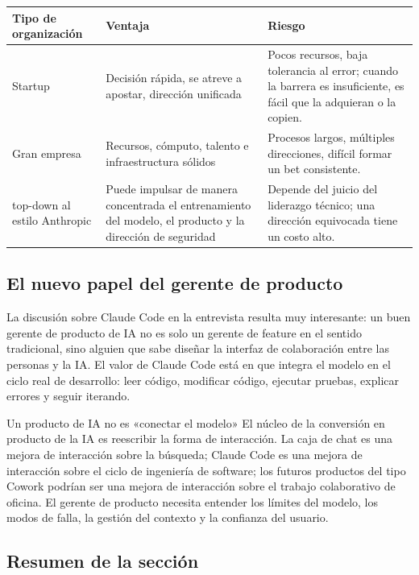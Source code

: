 \documentclass[a4paper]{article}
\begin{document}
\noindent\begin{tabularx}{\textwidth}{p{}p{}X}
\toprule
Tipo de organización & Ventaja & Riesgo \\
\midrule
Startup & Decisión rápida, se atreve a apostar, dirección unificada & Pocos recursos, baja tolerancia al error; cuando la barrera es insuficiente, es fácil que la adquieran o la copien. \\
Gran empresa & Recursos, cómputo, talento e infraestructura sólidos & Procesos largos, múltiples direcciones, difícil formar un bet consistente. \\
top-down al estilo Anthropic & Puede impulsar de manera concentrada el entrenamiento del modelo, el producto y la dirección de seguridad & Depende del juicio del liderazgo técnico; una dirección equivocada tiene un costo alto. \\
\bottomrule
\end{tabularx}

\subsection{El nuevo papel del gerente de producto}

La discusión sobre Claude Code en la entrevista resulta muy interesante: un buen gerente de producto de IA no es solo un gerente de feature en el sentido tradicional, sino alguien que sabe diseñar la interfaz de colaboración entre las personas y la IA. El valor de Claude Code está en que integra el modelo en el ciclo real de desarrollo: leer código, modificar código, ejecutar pruebas, explicar errores y seguir iterando.

\begin{knowledgebox}{Un producto de IA no es «conectar el modelo»}
El núcleo de la conversión en producto de la IA es reescribir la forma de interacción. La caja de chat es una mejora de interacción sobre la búsqueda; Claude Code es una mejora de interacción sobre el ciclo de ingeniería de software; los futuros productos del tipo Cowork podrían ser una mejora de interacción sobre el trabajo colaborativo de oficina. El gerente de producto necesita entender los límites del modelo, los modos de falla, la gestión del contexto y la confianza del usuario.
\end{knowledgebox}

\subsection{Resumen de la sección}
\end{document}
